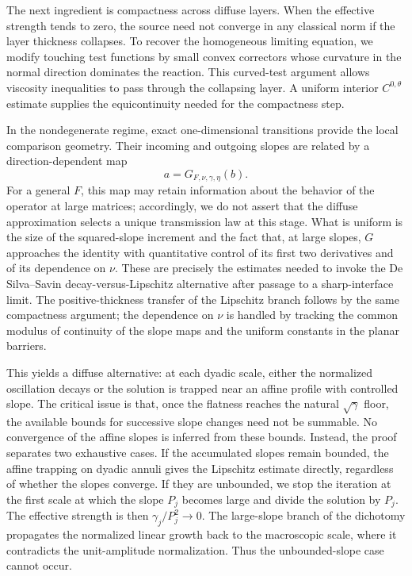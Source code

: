 \documentclass[11pt,letterpaper]{amsart}
\numberwithin{equation}{section}
\theoremstyle{definition}
\theoremstyle{remark}
\begin{document}
The next ingredient is compactness across diffuse layers. When the effective
strength tends to zero, the source need not converge in any classical norm if
the layer thickness collapses. To recover the homogeneous limiting equation,
we modify touching test functions by small convex correctors whose curvature
in the normal direction dominates the reaction. This curved-test argument
allows viscosity inequalities to pass through the collapsing layer. A
uniform interior $C^{0,\theta}$ estimate supplies the equicontinuity needed
for the compactness step.

In the nondegenerate regime, exact one-dimensional transitions provide the
local comparison geometry. Their incoming and outgoing slopes are related by
a direction-dependent map
$$
a
=
G_{F,\nu,\gamma,\eta}(b).
$$
For a general $F$, this map may retain information about the behavior of the
operator at large matrices; accordingly, we do not assert that the diffuse
approximation selects a unique transmission law at this stage. What is
uniform is the size of the squared-slope increment and the fact that, at large
slopes, $G$ approaches the identity with quantitative control of its first two
derivatives and of its dependence on $\nu$. These are precisely the estimates
needed to invoke the De Silva--Savin decay-versus-Lipschitz alternative after
passage to a sharp-interface limit. The positive-thickness transfer of the
Lipschitz branch follows by the same compactness argument; the dependence on
$\nu$ is handled by tracking the common modulus of continuity of the slope
maps and the uniform constants in the planar barriers.

This yields a diffuse alternative: at each dyadic scale, either the normalized
oscillation decays or the solution is trapped near an affine profile with
controlled slope. The critical issue is that, once the flatness reaches the
natural $\sqrt\gamma$ floor, the available bounds for successive slope changes
need not be summable. No convergence of the affine slopes is inferred from
these bounds. Instead, the proof separates two exhaustive cases. If the
accumulated slopes remain bounded, the affine trapping on dyadic annuli gives
the Lipschitz estimate directly, regardless of whether the slopes converge.
If they are unbounded, we stop the iteration at the first scale at which the
slope $P_j$ becomes large and divide the solution by $P_j$. The effective
strength is then $\gamma_j/P_j^2\to0$. The large-slope branch of the dichotomy
propagates the normalized linear growth back to the macroscopic scale, where
it contradicts the unit-amplitude normalization. Thus the unbounded-slope
case cannot occur.
\end{document}
